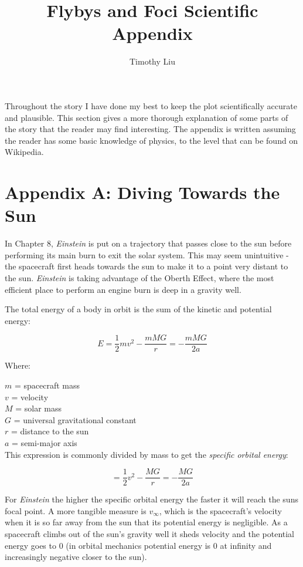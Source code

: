 \documentclass[12pt]{article} %
\title{Flybys and Foci Scientific Appendix}
\author{Timothy Liu}
\begin{document}
\maketitle

Throughout the story I have done my best to keep the plot scientifically accurate and plausible. This section gives a more thorough explanation of some parts of the story that the reader may find interesting. The appendix is written assuming the reader has some basic knowledge of physics, to the level that can be found on Wikipedia.

\section{Appendix A: Diving Towards the Sun}


In Chapter 8, \textit{Einstein} is put on a trajectory that passes close to the sun before performing its main burn to exit the solar system. This may seem unintuitive - the spacecraft first heads towards the sun to make it to a point very distant to the sun. \textit{Einstein} is taking advantage of the Oberth Effect, where the most efficient place to perform an engine burn is deep in a gravity well.

The total energy of a body in orbit is the sum of the kinetic and potential energy:

$$ E = \frac{1}{2} mv^2 - \frac{mMG}{r} = -\frac{mMG}{2a}$$

Where:

$m$ = spacecraft mass \\
$v$ = velocity \\
$M$ = solar mass\\
$G$ = universal gravitational constant\\
$r$ = distance to the sun\\
$a$ = semi-major axis\\

This expression is commonly divided by mass to get the \textit{specific orbital energy}:

$$ = \frac{1}{2} v^2 - \frac{MG}{r} = -\frac{MG}{2a}$$

For \textit{Einstein} the higher the specific orbital energy the faster it will reach the suns focal point. A more tangible measure is $v_{\infty}$, which is the spacecraft's velocity when it is so far away from the sun that its potential energy is negligible. As a spacecraft climbs out of the sun's gravity well it sheds velocity and the potential energy goes to 0 (in orbital mechanics potential energy is 0 at infinity and increasingly negative closer to the sun).
\end{document}
